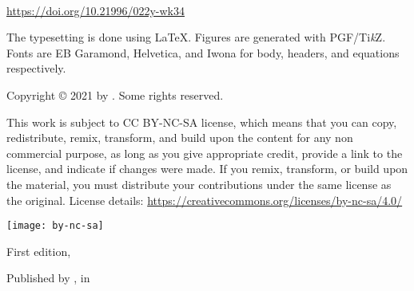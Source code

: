
{\small\setlength{\parindent}{0em}\setlength{\parskip}{1em}
~

\vfill

\url{https://doi.org/10.21996/022y-wk34}

The typesetting is done using \LaTeX. Figures are generated with PGF/Ti\textit{k}Z. Fonts are EB Garamond, Helvetica, and Iwona for body, headers, and equations respectively.


Copyright \copyright{} 2021 by \authorname. Some rights reserved.

This work is subject to CC BY-NC-SA license, which means that you can copy, redistribute, remix, transform, and build upon the content for any non commercial purpose, as long as you give appropriate credit, provide a link to the license, and indicate if changes were made. If you remix, transform, or build upon the material, you must distribute your contributions under the same license as the original. License details: \url{https://creativecommons.org/licenses/by-nc-sa/4.0/}

\texttt{[image: by-nc-sa]}

First edition, \editionyear{}


Published by \publisher{}, in \place{}
}\cleardoublepage

